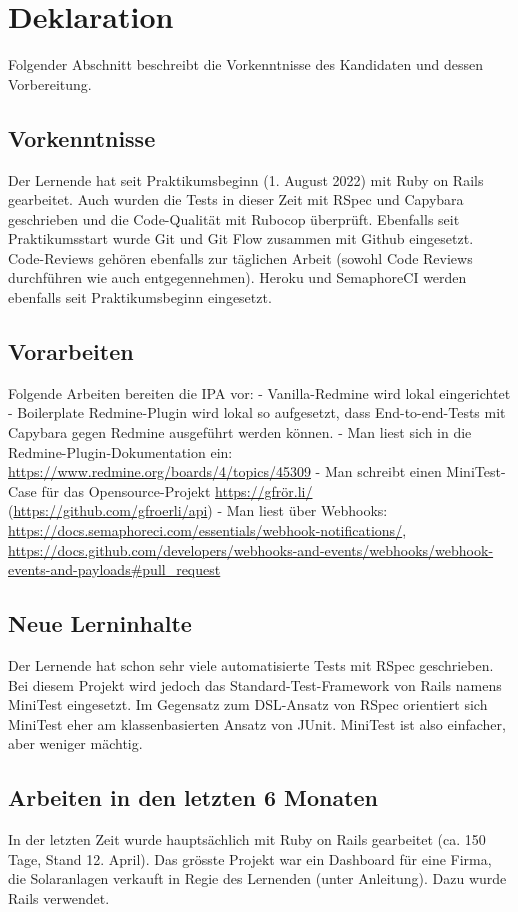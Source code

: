 \chapter{Deklaration}

Folgender Abschnitt beschreibt die Vorkenntnisse des Kandidaten und dessen Vorbereitung.

\section{Vorkenntnisse}

Der Lernende hat seit Praktikumsbeginn (1. August 2022) mit Ruby on Rails gearbeitet. Auch wurden die Tests in dieser Zeit mit RSpec und Capybara geschrieben und die Code-Qualität mit Rubocop überprüft. Ebenfalls seit Praktikumsstart wurde Git und Git Flow zusammen mit Github eingesetzt. Code-Reviews gehören ebenfalls zur täglichen Arbeit (sowohl Code Reviews durchführen wie auch entgegennehmen). Heroku und SemaphoreCI werden ebenfalls seit Praktikumsbeginn eingesetzt.

\section{Vorarbeiten}

Folgende Arbeiten bereiten die IPA vor: \newline
- Vanilla-Redmine wird lokal eingerichtet \newline
- Boilerplate Redmine-Plugin wird lokal so aufgesetzt, dass End-to-end-Tests mit Capybara gegen Redmine ausgeführt werden können. \newline
- Man liest sich in die Redmine-Plugin-Dokumentation ein: \url{https://www.redmine.org/boards/4/topics/45309} \newline
- Man schreibt einen MiniTest-Case für das Opensource-Projekt \url{https://gfrör.li/} (\url{https://github.com/gfroerli/api}) \newline
- Man liest über Webhooks: \url{https://docs.semaphoreci.com/essentials/webhook-notifications/}, \url{https://docs.github.com/developers/webhooks-and-events/webhooks/webhook-events-and-payloads\#pull\_request} \newline

\section{Neue Lerninhalte}

Der Lernende hat schon sehr viele automatisierte Tests mit RSpec geschrieben. Bei diesem Projekt wird jedoch das Standard-Test-Framework von Rails namens MiniTest eingesetzt. Im Gegensatz zum DSL-Ansatz von RSpec orientiert sich MiniTest eher am klassenbasierten Ansatz von JUnit. MiniTest ist also einfacher, aber weniger mächtig.

\section{Arbeiten in den letzten 6 Monaten}

In der letzten Zeit wurde hauptsächlich mit Ruby on Rails gearbeitet (ca. 150 Tage, Stand 12. April). Das grösste Projekt war ein Dashboard für eine Firma, die Solaranlagen verkauft in Regie des Lernenden (unter Anleitung). Dazu wurde Rails verwendet.
